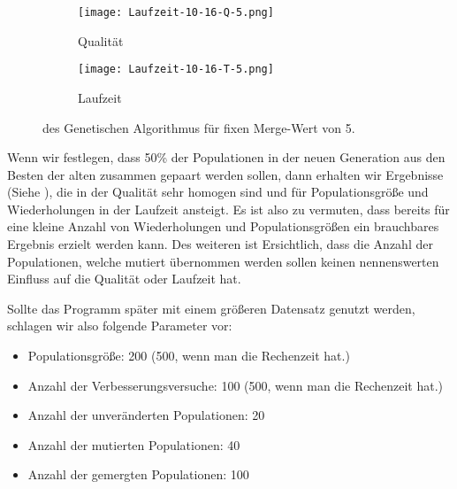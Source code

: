 \begin{figure}
  \begin{subfigure}{\textwidth}
  \texttt{[image: Laufzeit-10-16-Q-5.png]}
  \caption{Qualität}
  \label{fig:QualitätMerge5}
  \end{subfigure}

  \begin{subfigure}{\textwidth}
  \texttt{[image: Laufzeit-10-16-T-5.png]}
  \caption{Laufzeit}
  \label{fig:LaufzeitMerge5}
  \end{subfigure}
\caption{des Genetischen Algorithmus für fixen Merge-Wert von 5.\protect}
\label{fig:GenAlgMerge5}
\end{figure}

Wenn wir festlegen, dass 50\% der Populationen in der neuen Generation aus den Besten der alten zusammen gepaart werden sollen,
dann erhalten wir Ergebnisse (Siehe ), die in der Qualität sehr homogen sind und für Populationsgröße
und Wiederholungen in der Laufzeit ansteigt.
Es ist also zu vermuten, dass bereits für eine kleine Anzahl von Wiederholungen und Populationsgrößen
ein brauchbares Ergebnis erzielt werden kann.
Des weiteren ist Ersichtlich, dass die Anzahl der Populationen, welche mutiert übernommen werden sollen
keinen nennenswerten Einfluss auf die Qualität oder Laufzeit hat.


Sollte das Programm später mit einem größeren Datensatz genutzt werden, schlagen wir also folgende Parameter vor:
  \begin{itemize}
\itemsep2pt
  \item Populationsgröße: 200 (500, wenn man die Rechenzeit hat.)
  \item Anzahl der Verbesserungsversuche: 100 (500, wenn man die Rechenzeit hat.)
  \item Anzahl der unveränderten Populationen: 20
  \item Anzahl der mutierten Populationen: 40
  \item Anzahl der gemergten Populationen: 100
  \end{itemize}

